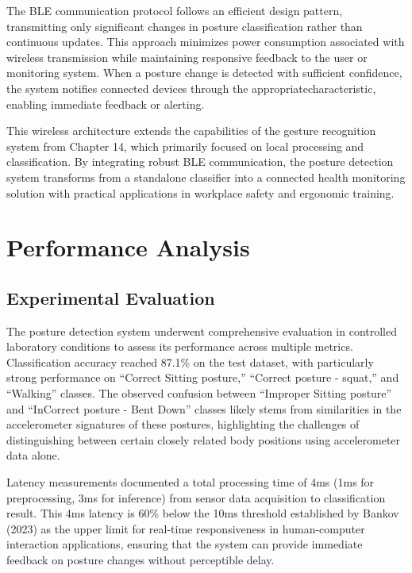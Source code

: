 \documentclass[
  9pt,
  letterpaper,
  abstract,
  titlepage]{scrbook}
\begin{document}
The BLE communication protocol follows an efficient design pattern,
transmitting only significant changes in posture classification rather
than continuous updates. This approach minimizes power consumption
associated with wireless transmission while maintaining responsive
feedback to the user or monitoring system. When a posture change is
detected with sufficient confidence, the system notifies connected
devices through the appropriatecharacteristic, enabling immediate
feedback or alerting.

This wireless architecture extends the capabilities of the gesture
recognition system from Chapter 14, which primarily focused on local
processing and classification. By integrating robust BLE communication,
the posture detection system transforms from a standalone classifier
into a connected health monitoring solution with practical applications
in workplace safety and ergonomic training.

\section{Performance Analysis}\label{performance-analysis}

\subsection{Experimental Evaluation}\label{experimental-evaluation}

The posture detection system underwent comprehensive evaluation in
controlled laboratory conditions to assess its performance across
multiple metrics. Classification accuracy reached 87.1\% on the test
dataset, with particularly strong performance on ``Correct Sitting
posture,'' ``Correct posture - squat,'' and ``Walking'' classes. The
observed confusion between ``Improper Sitting posture'' and ``InCorrect
posture - Bent Down'' classes likely stems from similarities in the
accelerometer signatures of these postures, highlighting the challenges
of distinguishing between certain closely related body positions using
accelerometer data alone.

Latency measurements documented a total processing time of 4ms (1ms for
preprocessing, 3ms for inference) from sensor data acquisition to
classification result. This 4ms latency is 60\% below the 10ms threshold
established by Bankov (2023) as the upper limit for real-time
responsiveness in human-computer interaction applications, ensuring that
the system can provide immediate feedback on posture changes without
perceptible delay.
\end{document}
